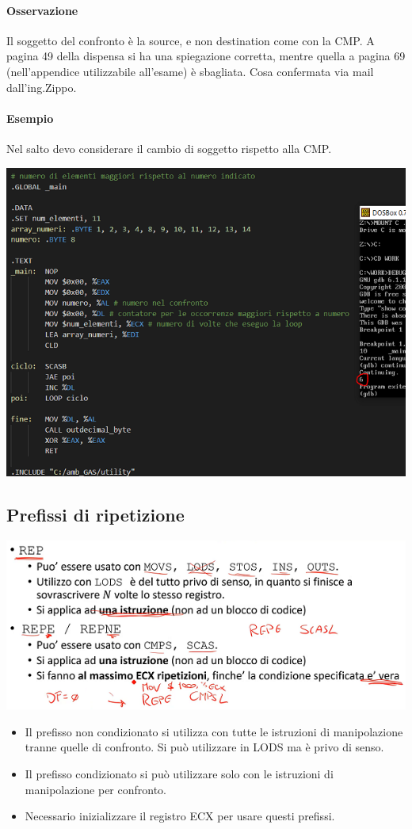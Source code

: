 \documentclass[11pt]{report}
\begin{document}
\paragraph{Osservazione} Il soggetto del confronto è la source, e non destination come con la CMP. A pagina 49 della dispensa si ha una spiegazione corretta, mentre quella a pagina 69 (nell'appendice utilizzabile all'esame) è sbagliata. Cosa confermata via mail dall'ing.Zippo.
\paragraph{Esempio} Nel salto devo considerare il cambio di soggetto rispetto alla CMP.
\begin{center}
\includegraphics{img/224.PNG}
\end{center}
\subsection{Prefissi di ripetizione}
\begin{center}
\includegraphics{img/64.PNG}
\end{center}
\begin{itemize}
\item Il prefisso non condizionato si utilizza con tutte le istruzioni di manipolazione tranne quelle di confronto. Si può utilizzare in LODS ma è privo di senso.
\item Il prefisso condizionato si può utilizzare solo con le istruzioni di manipolazione per confronto.
\item Necessario inizializzare il registro ECX per usare questi prefissi.
\end{itemize}
\end{document}
